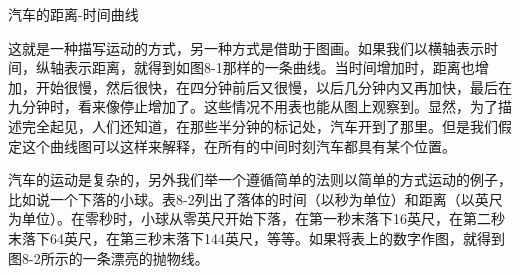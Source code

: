 \documentclass[12pt,oneside]{book}
\begin{document}
\begin{common-format}
\label{tab:表8.1}
\noindent
\begin{minipage}{\textwidth}
\begin{minipage}{0.3\textwidth}
\begin{table}[H]
\centering
\medskip 
{}
\caption*{表 8-1}
\end{table}

\end{minipage}\hfill
\begin{minipage}{0.7\textwidth}
\begin{linefig}[0.9]{汽车的距离-时间曲线}
\caption{汽车的距离-时间曲线}
\label{fig:汽车的距离-时间曲线}
\end{linefig}
\end{minipage} 
\end{minipage} 


这就是一种描写运动的方式，另一种方式是借助于图画。如果我们以横轴表示时间，纵轴表示距离，就得到如图8-1那样的一条曲线。当时间增加时，距离也增加，开始很慢，然后很快，在四分钟前后又很慢，以后几分钟内又再加快，最后在九分钟时，看来像停止增加了。这些情况不用表也能从图上观察到。显然，为了描述完全起见，人们还知道，在那些半分钟的标记处，汽车开到了那里。但是我们假定这个曲线图可以这样来解释，在所有的中间时刻汽车都具有某个位置。


汽车的运动是复杂的，另外我们举一个遵循简单的法则以简单的方式运动的例子，比如说一个下落的小球。表8-2列出了落体的时间（以秒为单位）和距离（以英尺为单位）。在零秒时，小球从零英尺开始下落，在第一秒末落下16英尺，在第二秒末落下64英尺，在第三秒末落下144英尺，等等。如果将表上的数字作图，就得到图8-2所示的一条漂亮的抛物线。


\end{common-format}
\end{document}
